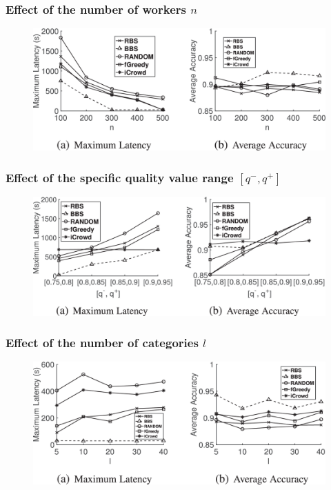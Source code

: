 \documentclass[UTF8]{beamer}
\begin{document}
\begin{frame}
    \frametitle{Effect of the number of workers $n$}
    \begin{figure}
        \includegraphics[width= 0.95\linewidth]{chen5-2849394-hires.png}
     \end{figure}
\end{frame}

\begin{frame}
    \frametitle{Effect of the speciﬁc quality value range $[q^-, q^+]$}
    \begin{figure}
        \includegraphics[width= 0.95\linewidth]{chen6-2849394-hires.png}
     \end{figure}
\end{frame}

\begin{frame}
    \frametitle{Effect of the number of categories $l$}
    \begin{figure}
        \includegraphics[width= 0.95\linewidth]{chen7-2849394-hires.png}
     \end{figure}
\end{frame}
\end{document}
